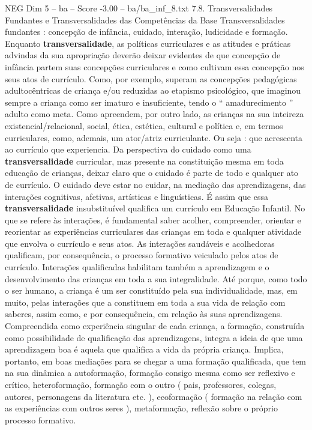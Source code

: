 \begin{textsample}{NEG Dim 5 – ba – Score -3.00 – ba/ba\_inf\_8.txt}  \label{ex:f5_neg_004}
7.8.
Transversalidades Fundantes e Transversalidades das Competências da Base Transversalidades fundantes : concepção de infância, cuidado, interação, ludicidade e formação.
Enquanto \textbf{transversalidade}, as políticas curriculares e as atitudes e práticas advindas da sua apropriação deverão deixar evidentes de que concepção de infância partem suas concepções curriculares e como cultivam essa concepção nos seus atos de currículo.
Como, por exemplo, superam as concepções pedagógicas adultocêntricas de criança e/ou reduzidas ao etapismo psicológico, que imaginou sempre a criança como ser imaturo e insuficiente, tendo o “ amadurecimento ” adulto como meta.
Como apreendem, por outro lado, as crianças na sua inteireza existencial/relacional, social, ética, estética, cultural e política e, em termos curriculares, como, ademais, um ator/atriz curriculante.
Ou seja : que acrescenta ao currículo que experiencia.
Da perspectiva do cuidado como uma \textbf{transversalidade} curricular, mas presente na constituição mesma em toda educação de crianças, deixar claro que o cuidado é parte de todo e qualquer ato de currículo.
O cuidado deve estar no cuidar, na mediação das aprendizagens, das interações cognitivas, afetivas, artísticas e linguísticas.
É assim que essa \textbf{transversalidade} insubstituível qualifica um currículo em Educação Infantil.
No que se refere às interações, é fundamental saber acolher, compreender, orientar e reorientar as experiências curriculares das crianças em toda e qualquer atividade que envolva o currículo e seus atos.
As interações saudáveis e acolhedoras qualificam, por consequência, o processo formativo veiculado pelos atos de currículo.
Interações qualificadas habilitam também a aprendizagem e o desenvolvimento das crianças em toda a sua integralidade.
Até porque, como todo o ser humano, a criança é um ser constituído pela sua individualidade, mas, em muito, pelas interações que a constituem em toda a sua vida de relação com saberes, assim como, e por consequência, em relação às suas aprendizagens.
Compreendida como experiência singular de cada criança, a formação, construída como possibilidade de qualificação das aprendizagens, integra a ideia de que uma aprendizagem boa é aquela que qualifica a vida da própria criança.
Implica, portanto, em boas mediações para se chegar a uma formação qualificada, que tem na sua dinâmica a autoformação, formação consigo mesma como ser reflexivo e crítico, heteroformação, formação com o outro ( pais, professores, colegas, autores, personagens da literatura etc. ), ecoformação ( formação na relação com as experiências com outros seres ), metaformação, reflexão sobre o próprio processo formativo.

\end{textsample}
